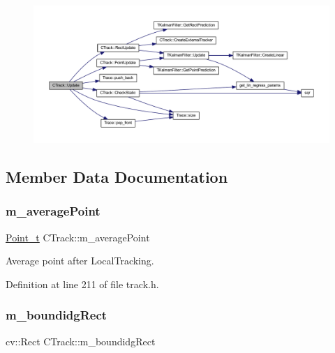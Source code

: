 \begin{figure}[H]
\begin{center}
\leavevmode
\includegraphics[width=350pt]{class_c_track_a582c4e1ad42d5985e0f395fa5a48bdbc_cgraph}
\end{center}
\end{figure}


\subsection{Member Data Documentation}
\mbox{\label{class_c_track_a4e569da5601959c866c4e62638c8c088}} 
\subsubsection{\texorpdfstring{m\+\_\+average\+Point}{m\_averagePoint}}
{\footnotesize\ttfamily \mbox{\hyperlink{defines_8h_a8c42696da8f098b91374a8e8bb84b430}{Point\+\_\+t}} C\+Track\+::m\+\_\+average\+Point}



Average point after Local\+Tracking. 



Definition at line 211 of file track.\+h.

\mbox{\label{class_c_track_a1d15e2cbc31754f60f6bbe30f218d0a4}} 
\subsubsection{\texorpdfstring{m\+\_\+boundidg\+Rect}{m\_boundidgRect}}
{\footnotesize\ttfamily cv\+::\+Rect C\+Track\+::m\+\_\+boundidg\+Rect}



